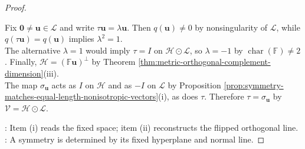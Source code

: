 \begin{proposition}
\begin{proof}
\begin{enumerate}[label=(\roman*)]
Fix $\mathbf{0}\neq\mathbf{u}\in\mathcal{L}$ and write $\tau\mathbf{u}=\lambda\mathbf{u}$. Then $q(\mathbf{u})\neq0$ by nonsingularity of $\mathcal{L}$, while $q(\tau\mathbf{u})=q(\mathbf{u})$ implies $\lambda^2=1$.\\
The alternative $\lambda=1$ would imply $\tau=I$ on $\mathcal{H}\odot\mathcal{L}$, so $\lambda=-1$ by $\operatorname{char}(\mathbb{F})\neq2$. Finally, $\mathcal{H}=(\mathbb{F}\mathbf{u})^{\perp}$ by Theorem \ref{thm:metric-orthogonal-complement-dimension}(iii).\\
The map $\sigma_{\mathbf{u}}$ acts as $I$ on $\mathcal{H}$ and as $-I$ on $\mathcal{L}$ by Proposition \ref{prop:symmetry-matches-equal-length-nonisotropic-vectors}(i), as does $\tau$. Therefore $\tau=\sigma_{\mathbf{u}}$ by $\mathcal{V}=\mathcal{H}\odot\mathcal{L}$.
\end{enumerate}
: Item (i) reads the fixed space; item (ii) reconstructs the flipped orthogonal line.\\
: A symmetry is determined by its fixed hyperplane and normal line.
\end{proof}
\end{proposition}

